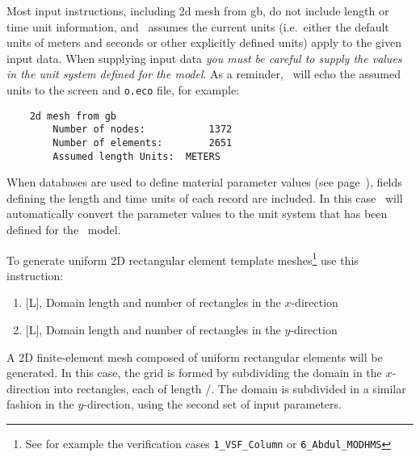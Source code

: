 Most input instructions, including \textsf{2d mesh from gb}, do not include length or time unit information, and \mut\ assumes the current units (i.e.\ either the default units of meters and seconds or other explicitly defined units) apply to the given input data. When supplying input data {\em you must be careful to supply the values in the unit system defined for the model}.  As a reminder, \mut\ will echo the assumed units to the screen and \texttt{o.eco} file, for example:
\begin{verbatim}
    2d mesh from gb
    	Number of nodes:           1372
    	Number of elements:        2651
    	Assumed length Units:  METERS
\end{verbatim}

When databases are used to define material parameter values (see page~\pageref{page:LookupTable}), fields defining the length and time units of each record are included. In this case \mut\ will automatically convert the parameter values to the unit system that has been defined for the \mfus\ model.

\pagebreak
To generate uniform 2D rectangular element template meshes\footnote{See for example the verification cases \texttt{1\_VSF\_Column} or \texttt{6\_Abdul\_MODHMS}} use this instruction:

    {
    \squish
    \begin{enumerate}
    \item {}[L],   Domain length and number of rectangles in the $x$-direction
    \item {}[L],   Domain length and number of rectangles in the $y$-direction
    \end{enumerate}
    A 2D finite-element mesh composed of uniform rectangular elements will be generated. In this case, the
    grid is formed by subdividing the domain in the $x$-direction into  rectangles, each of length
    /. The domain is subdivided in a similar fashion in the $y$-direction, using the second set of input parameters.
    }



%
%

